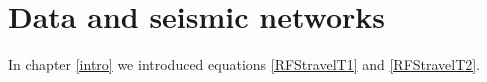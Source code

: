 \chapter{Data and seismic networks}
\label{datachap}

In chapter \ref{intro} we introduced equations \ref{RFStravelT1} and \ref{RFStravelT2}.